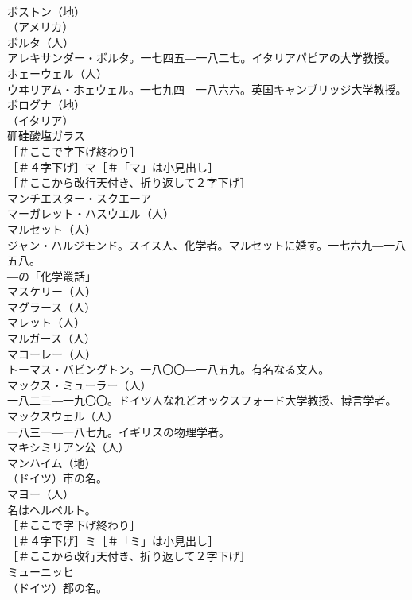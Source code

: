 \documentclass[8pt]{extreport}
\begin{document}
\begin{CJK}{UTF8}{min}
\\	ボストン（地）
\\	（アメリカ）
\\	ボルタ（人）
\\	アレキサンダー・ボルタ。一七四五―一八二七。イタリアパピアの大学教授。
\\	ホェーウェル（人）
\\	ウヰリアム・ホェウェル。一七九四―一八六六。英国キャンブリッジ大学教授。
\\	ボログナ（地）
\\	（イタリア）
\\	硼硅酸塩ガラス 
\\	［＃ここで字下げ終わり］
\\	［＃４字下げ］マ［＃「マ」は小見出し］
\\	［＃ここから改行天付き、折り返して２字下げ］
\\	マンチエスター・スクエーア 
\\	マーガレット・ハスウエル（人）
\\	マルセット（人）
\\	ジャン・ハルジモンド。スイス人、化学者。マルセットに婚す。一七六九―一八五八。
\\	―の「化学叢話」 
\\	マスケリー（人）
\\	マグラース（人）
\\	マレット（人）
\\	マルガース（人） 
\\	マコーレー（人）
\\	トーマス・バビングトン。一八〇〇―一八五九。有名なる文人。
\\	マックス・ミューラー（人）
\\	一八二三―一九〇〇。ドイツ人なれどオックスフォード大学教授、博言学者。
\\	マックスウェル（人）
\\	一八三一―一八七九。イギリスの物理学者。
\\	マキシミリアン公（人）
\\	マンハイム（地）
\\	（ドイツ）市の名。
\\	マヨー（人）
\\	名はヘルベルト。
\\	［＃ここで字下げ終わり］
\\	［＃４字下げ］ミ［＃「ミ」は小見出し］
\\	［＃ここから改行天付き、折り返して２字下げ］
\\	ミューニッヒ 
\\	（ドイツ）都の名。

\end{CJK}
\end{document}
